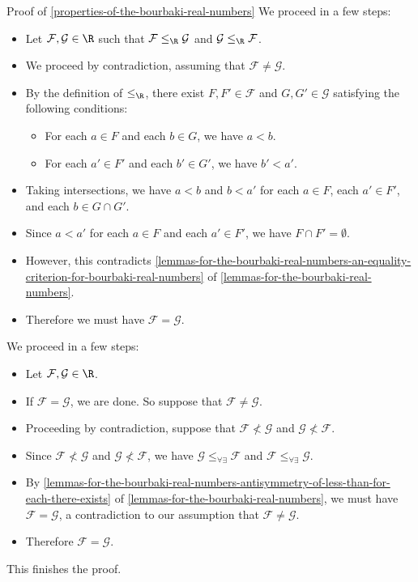 \begin{Proof}{Proof of \cref{properties-of-the-bourbaki-real-numbers}}
    We proceed in a few steps:
    \begin{itemize}
        \item Let $\mathcal{F},\mathcal{G}\in\R$ such that $\mathcal{F}\leq_{\R}\mathcal{G}$ and $\mathcal{G}\leq_{\R}\mathcal{F}$.
        \item We proceed by contradiction, assuming that $\mathcal{F}\neq\mathcal{G}$.
        \item By the definition of $\leq_{\R}$, there exist $F,F'\in\mathcal{F}$ and $G,G'\in\mathcal{G}$ satisfying the following conditions:
            \begin{itemize}
                \item For each $a\in F$ and each $b\in G$, we have $a\lt b$.
                \item For each $a'\in F'$ and each $b'\in G'$, we have $b'\lt a'$.
            \end{itemize}
        \item Taking intersections, we have $a\lt b$ and $b\lt a'$ for each $a\in F$, each $a'\in F'$, and each $b\in G\cap G'$.
        \item Since $a\lt a'$ for each $a\in F$ and each $a'\in F'$, we have $F\cap F'=\emptyset$.
        \item However, this contradicts \cref{lemmas-for-the-bourbaki-real-numbers-an-equality-criterion-for-bourbaki-real-numbers} of \cref{lemmas-for-the-bourbaki-real-numbers}.
        \item Therefore we must have $\mathcal{F}=\mathcal{G}$.
    \end{itemize}

    We proceed in a few steps:
    \begin{itemize}
        \item Let $\mathcal{F},\mathcal{G}\in\R$.
        \item If $\mathcal{F}=\mathcal{G}$, we are done. So suppose that $\mathcal{F}\neq\mathcal{G}$.
        \item Proceeding by contradiction, suppose that $\mathcal{F}\nless\mathcal{G}$ and $\mathcal{G}\nless\mathcal{F}$.
        \item Since $\mathcal{F}\nless\mathcal{G}$ and $\mathcal{G}\nless\mathcal{F}$, we have $\mathcal{G}\leq_{\forall\exists}\mathcal{F}$ and $\mathcal{F}\leq_{\forall\exists}\mathcal{G}$.
        \item By \cref{lemmas-for-the-bourbaki-real-numbers-antisymmetry-of-less-than-for-each-there-exists} of \cref{lemmas-for-the-bourbaki-real-numbers}, we must have $\mathcal{F}=\mathcal{G}$, a contradiction to our assumption that $\mathcal{F}\neq\mathcal{G}$.
        \item Therefore $\mathcal{F}=\mathcal{G}$.
    \end{itemize}
    This finishes the proof.


\end{Proof}
